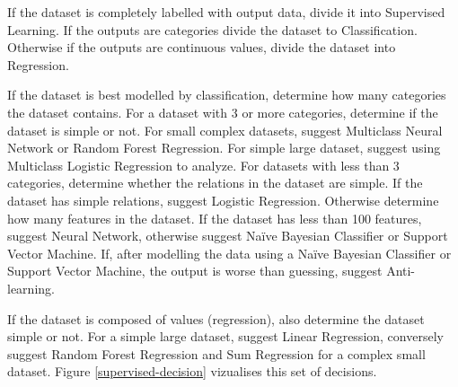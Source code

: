 \documentclass[a4paper,titlepage]{article}
\begin{document}
If the dataset is completely labelled with output data, divide it into Supervised Learning. 
If the outputs are categories divide the dataset to Classification. 
Otherwise if the outputs are continuous values, divide the dataset into Regression.

If the dataset is best modelled by classification, determine how many categories the dataset contains. 
For a dataset with 3 or more categories, determine if the dataset is simple or not. 
For small complex datasets, suggest Multiclass Neural Network or Random Forest Regression. 
For simple large dataset, suggest using Multiclass Logistic Regression to analyze. 
For datasets with less than 3 categories, determine whether the relations in the dataset are simple. 
If the dataset has simple relations, suggest Logistic Regression. Otherwise determine how many features in the dataset. 
If the dataset has less than 100 features, suggest Neural Network, otherwise suggest Naïve Bayesian Classifier or Support Vector Machine. 
If, after modelling the data using a Naïve Bayesian Classifier or Support Vector Machine, the output is worse than guessing, suggest Anti-learning.

If the dataset is composed of values (regression), also determine the dataset simple or not. For a simple large dataset, suggest Linear Regression, conversely suggest Random Forest Regression and Sum Regression for a complex small dataset. 
Figure \ref{supervised-decision} vizualises this set of decisions.
\end{document}
